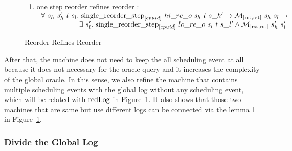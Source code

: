 \begin{figure}
\noindent{}
\begin{enumerate}
\item one$\_$step$\_$reorder$\_$refines$\_$reorder : \\
$
\begin{array}{l}
\forall \ s_h \ s_h' \ t \ s_l . \ \singlereorderstep{cpuid}{hi\_re\_o}{s_h}{t}{s\_h'} \rightarrow \matchrrstaterrstae{s_h}{s_l} \rightarrow \\
\ \ \ \ \ \ \ \ \ \ \ \ \ \ \ \ \exists\ s_l' . \  \singlereorderstep{cpuid}{lo\_re\_o}{s_l}{t}{s\_l'} \wedge  \matchrrstaterrstae{s_h'}{s_l'}\\
\end{array}
$
\end{enumerate}
\caption{Reorder Refines Reorder}
\label{fig:chapter:conlink:reorder-refines-reorder}
\end{figure}
After that, 
the machine does not need to keep the 
all scheduling event at all because it does not necessary 
for the oracle query 
and it increases the complexity of the global oracle. 
In this sense, 
we also refine the machine 
that contains multiple scheduling events with the global log without any scheduling event,
which will be related with ${\mathrm{redLog}}$ in Figure~\ref{fig:chapter:conlink:reorder-refines-reorder}.
It also shows that those two machines
that are same but use different logs
can be connected via the lemma 1 in  Figure~\ref{fig:chapter:conlink:reorder-refines-reorder}.



\subsubsection{Divide the Global Log}

